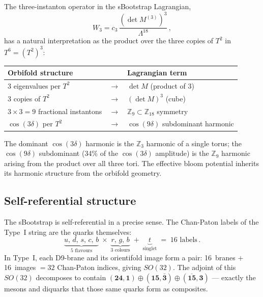\documentclass[12pt,a4paper]{article}
\begin{document}
The three-instanton operator in the sBootstrap Lagrangian,
\begin{equation}
  W_3 = c_3\,\frac{(\det M^{(3)})^3}{\Lambda^{18}}\,,
\end{equation}
has a natural interpretation as the product over the three copies of
$T^2$ in $T^6 = (T^2)^3$:
\begin{center}
\begin{tabular}{lcl}
\toprule
Orbifold structure & & Lagrangian term \\
\midrule
3 eigenvalues per $T^2$ & $\to$ & $\det M$ (product of 3) \\
3 copies of $T^2$ & $\to$ & $(\det M)^3$ (cube) \\
$3 \times 3 = 9$ fractional instantons & $\to$ &
  $\mathbb{Z}_9 \subset \mathbb{Z}_{18}$ symmetry \\
$\cos(3\delta)$ per $T^2$ & $\to$ &
  $\cos(9\delta)$ subdominant harmonic \\
\bottomrule
\end{tabular}
\end{center}

\noindent
The dominant $\cos(3\delta)$ harmonic is the $\mathbb{Z}_3$
harmonic of a single torus; the $\cos(9\delta)$ subdominant
(34\% of the $\cos(3\delta)$ amplitude) is the $\mathbb{Z}_9$
harmonic arising from the product over all three tori.  The
effective bloom potential inherits its harmonic structure from the
orbifold geometry.

\subsection{Self-referential structure}

The sBootstrap is self-referential in a precise sense.  The
Chan-Paton labels of the Type~I string are the quarks themselves:
\begin{equation}
  \underbrace{u,\, d,\, s,\, c,\, b}_{\text{5 flavours}}
  \;\times\;
  \underbrace{r,\, g,\, b}_{\text{3 colours}}
  \;+\;
  \underbrace{t}_{\text{singlet}}
  \;=\; 16 \text{ labels}\,.
\end{equation}
In Type~I, each D9-brane and its orientifold image form a pair:
16~branes $+$ 16~images $= 32$ Chan-Paton indices, giving $SO(32)$.
The adjoint of this $SO(32)$ decomposes to contain
$(\mathbf{24},\mathbf{1}) \oplus (\mathbf{15},\bar{\mathbf{3}})
\oplus (\overline{\mathbf{15}},\mathbf{3})$ --- exactly the mesons
and diquarks that those same quarks form as composites.
\end{document}
